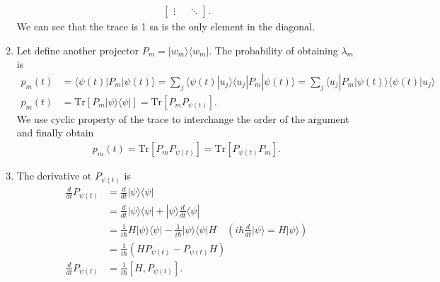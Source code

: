 \documentclass[letterpaper,11pt,twoside]{article}
\newcommand{\ket}[1]{|#1\rangle}
\newcommand{\bra}[1]{\langle#1|}
\newcommand{\braket}[1]{\langle#1\rangle}
\begin{document}
\begin{enumerate}[itemsep=0pt,topsep=0pt,label=\alph*)]
\begin{align*}
\begin{bmatrix}
      \vdots&&\ddots
    \end{bmatrix}.
  \end{align*}
  We can see that the trace is 1 sa is the only element in the diagonal.
  \item Let define another projector $P_m=\ket{w_m}\bra{w_m}$. The probability of obtaining $\lambda_m$ is 
  \begin{align*}
    p_m(t)&=\braket{\psi(t)|P_m|\psi(t)}=\sum_j\braket{\psi(t)|u_j}\braket{u_j|P_m|\psi(t)}=\sum_j\braket{u_j|P_m|\psi(t)}\braket{\psi(t)|u_j}\\
    p_m(t)&=\text{Tr}[P_m\ket{\psi}\bra{\psi}]=\text{Tr}[P_mP_{\psi(t)}].
  \end{align*}
  We use cyclic property of the trace to interchange the order of the argument and finally obtain
  \begin{align*}
    p_m(t)=\text{Tr}[P_mP_{\psi(t)}]=\text{Tr}[P_{\psi(t)}P_m].
  \end{align*}
  \item The derivative ot $P_{\psi(t)}$ is 
  \begin{align*}
    \frac{d}{dt}P_{\psi(t)}&=\frac{d}{dt}\ket{\psi}\bra{\psi}\\
    &=\frac{d}{dt}\ket{\psi}\bra{\psi}+\ket{\psi}\frac{d}{dt}\bra{\psi}\\
    &=\frac{1}{i\hbar} H\ket{\psi}\bra{\psi}-\frac{1}{i\hbar}\ket{\psi}\bra{\psi}H\quad\left(i\hbar\frac{d}{dt}\ket{\psi}=H\ket{\psi}\right)\\
    &=\frac{1}{i\hbar}(HP_{\psi(t)}-P_{\psi(t)}H)\\
    \frac{d}{dt}P_{\psi(t)}&=\frac{1}{i\hbar}[H,P_{\psi(t)}].
  \end{align*}
\end{enumerate}



%
\end{document}
